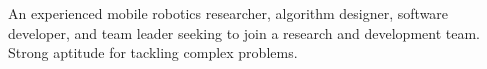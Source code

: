 An experienced mobile robotics researcher, algorithm designer, software developer, and team leader seeking to join a research and development team. Strong aptitude for tackling complex problems.

